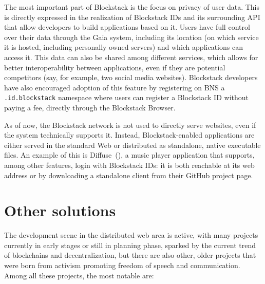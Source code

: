 \documentclass[mscthesis]{usiinfthesis}
\begin{document}
The most important part of Blockstack is the focus on privacy of user data. This is directly expressed in the realization of Blockstack IDs and its surrounding API that allow developers to build applications based on it. Users have full control over their data through the Gaia system, including its location (on which service it is hosted, including personally owned servers) and which applications can access it. This data can also be shared among different services, which allows for better interoperability between applications, even if they are potential competitors (say, for example, two social media websites). Blockstack developers have also encouraged adoption of this feature by registering on BNS a \texttt{.id.blockstack} namespace where users can register a Blockstack ID without paying a fee, directly through the Blockstack Browser.

As of now, the Blockstack network is not used to directly serve websites, even if the system technically supports it. Instead, Blockstack-enabled applications are either served in the standard Web or distributed as standalone, native executable files.
An example of this is Diffuse~(\cite{website:diffuse}), a music player application that supports, among other features, login with Blockstack IDs: it is both reachable at its web address or by downloading a standalone client from their GitHub project page.

\section{Other solutions}\label{sec:browserprojects}

The development scene in the distributed web area is active, with many projects currently in early stages or still in planning phase, sparked by the current trend of blockchains and decentralization, but there are also other, older projects that were born from activism promoting freedom of speech and communication. Among all these projects, the most notable are:
\end{document}
